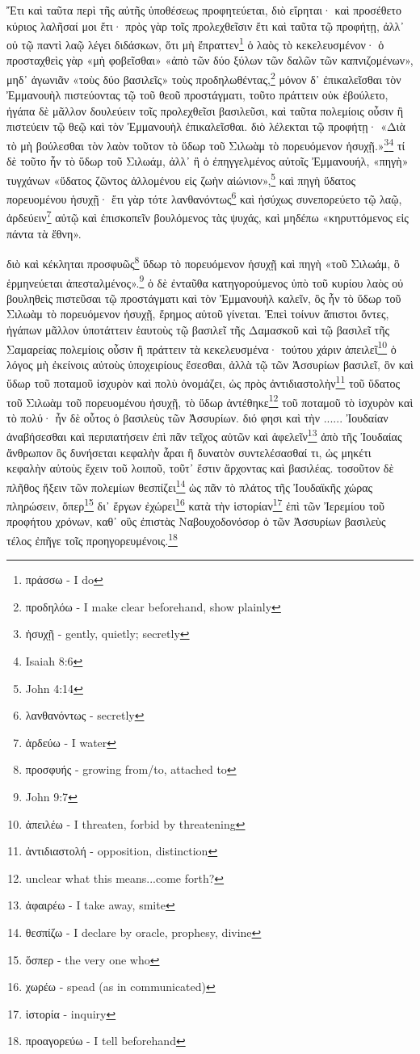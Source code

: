 
Ἔτι
καὶ
ταῦτα
περὶ
τῆς
αὐτῆς
ὑποθέσεως
προφητεύεται,
διὸ
εἴρηται·
καὶ
προσέθετο
κύριος
λαλῆσαί
μοι
ἔτι·
πρὸς
γὰρ
τοῖς
προλεχθεῖσιν
ἔτι
καὶ
ταῦτα
τῷ
προφήτῃ,
ἀλλ᾽
οὐ
τῷ
παντὶ
λαῷ
λέγει
διδάσκων,
ὅτι
μὴ
ἔπραττεν\footnote{πράσσω - I do}
ὁ
λαὸς
τὸ
κεκελευσμένον·
ὁ
προσταχθεὶς
γὰρ
«μὴ
φοβεῖσθαι»
«ἀπὸ
τῶν
δύο
ξύλων
τῶν
δαλῶν
τῶν
καπνιζομένων»,
μηδ᾽
ἀγωνιᾶν
«τοὺς
δύο
βασιλεῖς»
τοὺς
προδηλωθέντας,\footnote{προδηλόω - I make clear beforehand, show plainly}
μόνον
δ᾽
ἐπικαλεῖσθαι
τὸν
Ἐμμανουὴλ
πιστεύοντας
τῷ
τοῦ
θεοῦ
προστάγματι,
τοῦτο
πράττειν
οὐκ
ἐβούλετο,
ἠγάπα
δὲ
μᾶλλον
δουλεύειν
τοῖς
προλεχθεῖσι
βασιλεῦσι,
καὶ
ταῦτα
πολεμίοις
οὖσιν
ἢ
πιστεύειν
τῷ
θεῷ
καὶ
τὸν
Ἐμμανουὴλ
ἐπικαλεῖσθαι.
διὸ
λέλεκται
τῷ
προφήτῃ·
«Διὰ
τὸ
μὴ
βούλεσθαι
τὸν
λαὸν
τοῦτον
τὸ
ὕδωρ
τοῦ
Σιλωὰμ
τὸ
πορευόμενον
ἡσυχῇ.»\footnote{ἡσυχῇ - gently, quietly; secretly}\footnote{Isaiah 8:6}
τί
δὲ
τοῦτο
ἦν
τὸ
ὕδωρ
τοῦ
Σιλωάμ,
ἀλλ᾽
ἢ
ὁ
ἐπηγγελμένος
αὐτοῖς
Ἐμμανουήλ,
«πηγὴ»
τυγχάνων
«ὕδατος
ζῶντος
ἁλλομένου
εἰς
ζωὴν
αἰώνιον»,\footnote{John 4:14}
καὶ
πηγὴ
ὕδατος
πορευομένου
ἡσυχῇ·
ἔτι
γὰρ
τότε
λανθανόντως\footnote{λανθανόντως - secretly}
καὶ
ἡσύχως
συνεπορεύετο
τῷ
λαῷ,
ἀρδεύειν\footnote{ἀρδεύω - I water}
αὐτῷ
καὶ
ἐπισκοπεῖν
βουλόμενος
τὰς
ψυχάς,
καὶ
μηδέπω
«κηρυττόμενος
εἰς
πάντα
τὰ
ἔθνη».

διὸ
καὶ
κέκληται
προσφυῶς\footnote{προσφυής - growing from/to, attached to}
ὕδωρ
τὸ
πορευόμενον
ἡσυχῇ
καὶ
πηγὴ
«τοῦ
Σιλωάμ,
ὃ
ἑρμηνεύεται
ἀπεσταλμένος».\footnote{John 9:7}
ὁ
δὲ
ἐνταῦθα
κατηγορούμενος
ὑπὸ
τοῦ
κυρίου
λαὸς
οὐ
βουληθεὶς
πιστεῦσαι
τῷ
προστάγματι
καὶ
τὸν
Ἐμμανουὴλ
καλεῖν,
ὃς
ἦν
τὸ
ὕδωρ
τοῦ
Σιλωὰμ
τὸ
πορευόμενον
ἡσυχῇ,
ἔρημος
αὐτοῦ
γίνεται.
Ἐπεὶ
τοίνυν
ἄπιστοι
ὄντες,
ἠγάπων
μᾶλλον
ὑποτάττειν
ἑαυτοὺς
τῷ
βασιλεῖ
τῆς
Δαμασκοῦ
καὶ
τῷ
βασιλεῖ
τῆς
Σαμαρείας
πολεμίοις
οὖσιν
ἢ
πράττειν
τὰ
κεκελευσμένα·
τούτου
χάριν
ἀπειλεῖ\footnote{ἀπειλέω - I threaten, forbid by threatening}
ὁ
λόγος
μὴ
ἐκείνοις
αὐτοὺς
ὑποχειρίους
ἔσεσθαι,
ἀλλὰ
τῷ
τῶν
Ἀσσυρίων
βασιλεῖ,
ὃν
καὶ
ὕδωρ
τοῦ
ποταμοῦ
ἰσχυρὸν
καὶ
πολὺ
ὀνομάζει,
ὡς
πρὸς
ἀντιδιαστολὴν\footnote{ἀντιδιαστολή - opposition, distinction}
τοῦ
ὕδατος
τοῦ
Σιλωὰμ
τοῦ
πορευομένου
ἡσυχῇ,
τὸ
ὕδωρ
ἀντέθηκε\footnote{unclear what this means...come forth?}
τοῦ
ποταμοῦ
τὸ
ἰσχυρὸν
καὶ
τὸ
πολύ·
ἦν
δὲ
οὗτος
ὁ
βασιλεὺς
τῶν
Ἀσσυρίων.
διό
φησι
καὶ
τὴν
......
Ἰουδαίαν
ἀναβήσεσθαι
καὶ
περιπατήσειν
ἐπὶ
πᾶν
τεῖχος
αὐτῶν
καὶ
ἀφελεῖν\footnote{ἀφαιρέω - I take away, smite}
ἀπὸ
τῆς
Ἰουδαίας
ἄνθρωπον
ὃς
δυνήσεται
κεφαλὴν
ἆραι
ἢ
δυνατὸν
συντελέσασθαί
τι,
ὡς
μηκέτι
κεφαλὴν
αὐτοὺς
ἔχειν
τοῦ
λοιποῦ,
τοῦτ᾽
ἔστιν
ἄρχοντας
καὶ
βασιλέας.
τοσοῦτον
δὲ
πλῆθος
ἥξειν
τῶν
πολεμίων
θεσπίζει\footnote{θεσπίζω - I declare by oracle, prophesy, divine}
ὡς
πᾶν
τὸ
πλάτος
τῆς
Ἰουδαϊκῆς
χώρας
πληρώσειν,
ὅπερ\footnote{ὅσπερ - the very one who}
δι᾽
ἔργων
ἐχώρει\footnote{χωρέω - spead (as in communicated)}
κατὰ
τὴν
ἱστορίαν\footnote{ἱστορία - inquiry}
ἐπὶ
τῶν
Ἰερεμίου
τοῦ
προφήτου
χρόνων,
καθ᾽
οὓς
ἐπιστὰς
Ναβουχοδονόσορ
ὁ
τῶν
Ἀσσυρίων
βασιλεὺς
τέλος
ἐπῆγε
τοῖς
προηγορευμένοις.\footnote{προαγορεύω - I tell beforehand}

